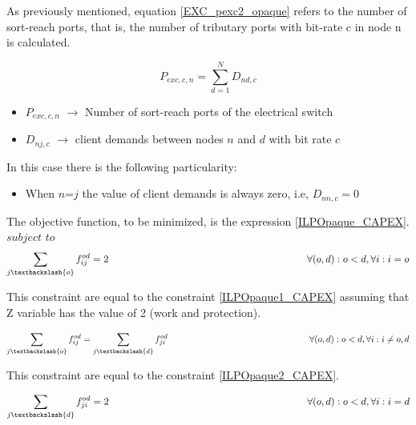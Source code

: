 \vspace{11pt}
As previously mentioned, equation \ref{EXC_pexc2_opaque} refers to the number of sort-reach ports, that is, the number of tributary ports with bit-rate c in node n is calculated.

\begin{equation}
P_{exc,c,n} = \sum_{d=1}^{N} D_{nd,c}
\label{EXC_pexc2_opaquep}
\end{equation}

\begin{itemize}
\item{$P_{exc,c,n}$	$\rightarrow$	Number of sort-reach ports of the electrical switch}
\item{$D_{nj,c}$	$\rightarrow$	client demands between nodes $n$ and $d$ with bit rate $c$}
\end{itemize}

\newpage
In this case there is the following particularity:

\begin{itemize}
  \item When $n$=$j$ the value of client demands is always zero, i.e, $D_{nn,c}=0$
\end{itemize}


\vspace{17pt}
The objective function, to be minimized, is the expression \ref{ILPOpaque_CAPEX}.\\

$subject$ $to$
\begin{equation}
\sum_{j\textbackslash \{o\}} f_{ij}^{od} = 2  \qquad \qquad \qquad \qquad \qquad \qquad \qquad \qquad \qquad \qquad
\forall(o,d) : o < d, \forall i: i = o
\label{ILPOpaque1}
\end{equation}

This constraint are equal to the constraint \ref{ILPOpaque1_CAPEX} assuming that Z variable has the value of 2 (work and protection).

\begin{equation}
\sum_{j\textbackslash \{o\}} f_{ij}^{od} = \sum_{j\textbackslash \{d\}} f_{ji}^{od}   \qquad \qquad \qquad \qquad \qquad \qquad \qquad \qquad
\forall(o,d) : o < d, \forall i: i \neq o,d
\label{ILPOpaque2}
\end{equation}

This constraint are equal to the constraint \ref{ILPOpaque2_CAPEX}.

\begin{equation}
\sum_{j\textbackslash \{d\}} f_{ji}^{od} = 2  \qquad \qquad \qquad \qquad \qquad \qquad \qquad \qquad \qquad \qquad
\forall(o,d) : o < d, \forall i: i = d
\label{ILPOpaque3}
\end{equation}

